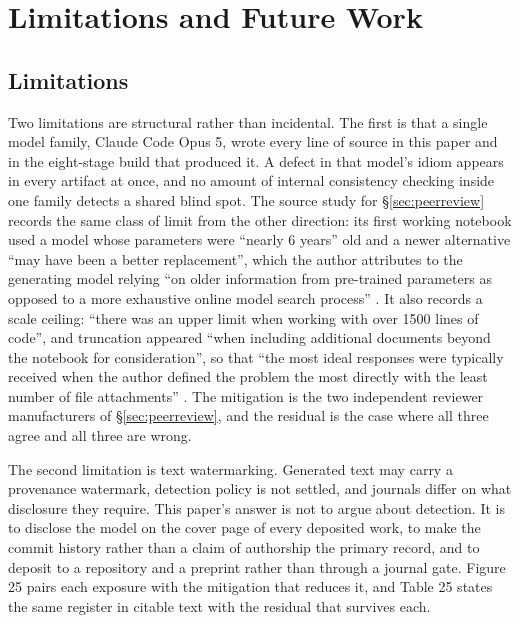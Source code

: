 \section{Limitations and Future Work}
\label{sec:limitations}

\subsection{Limitations}

Two limitations are structural rather than incidental. The first is that a
single model family, Claude Code Opus 5, wrote every line of source in this
paper and in the eight-stage build that produced it. A defect in that model's
idiom appears in every artifact at once, and no amount of internal consistency
checking inside one family detects a shared blind spot. The source study for \S\ref{sec:peerreview}
records the same class of limit from the other direction: its first working
notebook used a model whose parameters were ``nearly 6 years'' old and a newer
alternative ``may have been a better replacement'', which the author attributes
to the generating model relying ``on older information from pre-trained
parameters as opposed to a more exhaustive online model search process''
\cite{aiprgliomatc}. It also records a scale ceiling: ``there was an upper limit
when working with over 1500 lines of code'', and truncation appeared ``when
including additional documents beyond the notebook for consideration'', so that
``the most ideal responses were typically received when the author defined the
problem the most directly with the least number of file attachments''
\cite{aiprgliomatc}. The mitigation is the two independent reviewer
manufacturers of \S\ref{sec:peerreview}, and the residual is the case where all three agree and all
three are wrong.

The second limitation is text watermarking. Generated text may carry a
provenance watermark, detection policy is not settled, and journals differ on
what disclosure they require. This paper's answer is not to argue about
detection. It is to disclose the model on the cover page of every deposited
work, to make the commit history rather than a claim of authorship the primary
record, and to deposit to a repository and a preprint rather than through a
journal gate. Figure 25 pairs each exposure with the mitigation that reduces it,
and Table 25 states the same register in citable text with the residual that
survives each.

